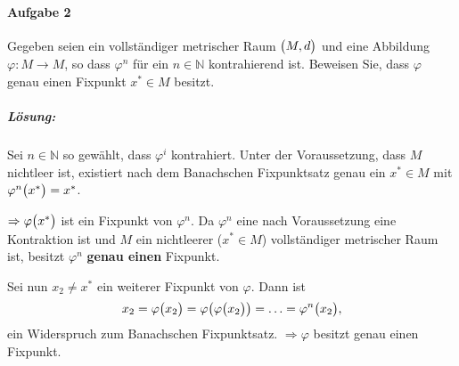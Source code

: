 \documentclass{scrreprt}
\begin{document}
\newpage
\paragraph{Aufgabe 2} Gegeben seien ein vollständiger metrischer Raum
$\qty\big(M, d)$ und eine Abbildung $\varphi \colon M \to M$, so dass
$\varphi^n$ für ein $n \in \mathbb{N}$ kontrahierend ist.
Beweisen Sie, dass $\varphi$ genau einen Fixpunkt $x^* \in M$ besitzt.

\subparagraph{Lösung:} Sei $n \in \mathbb{N}$ so gewählt, dass $\varphi^i$
kontrahiert.
Unter der Voraussetzung, dass $M$ nichtleer ist, existiert nach dem Banachschen
Fixpunktsatz genau ein $x^* \in M$ mit $\varphi^n\qty\big(x^*) = x^*$.
$\Rightarrow \varphi\qty\big(x^*)$ ist ein Fixpunkt von $\varphi^n$.
Da $\varphi^n$ eine nach Voraussetzung eine Kontraktion ist und $M$
ein nichtleerer ($x^* \in M$) vollständiger metrischer Raum ist, besitzt
$\varphi^n$ \textbf{genau einen} Fixpunkt.
Sei nun $x_2 \ne x^*$ ein weiterer Fixpunkt von $\varphi$. Dann ist
\[
  x_2 = \varphi\qty\big(x_2) = \varphi\qty\big(\varphi\qty\big(x_2))
  = \ldots = \varphi^n\qty\big(x_2),
\]
ein Widerspruch zum Banachschen Fixpunktsatz.
$\Rightarrow \varphi$ besitzt genau einen Fixpunkt.
\end{document}
